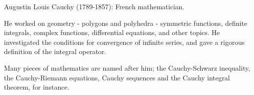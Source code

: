 Augustin Louis Cauchy (1789-1857): French mathematician.
\par
He worked on geometry - polygons and polyhedra - symmetric functions, 
definite integrals, complex functions, differential equations, and other
topics. He investigated the conditions for convergence
of infinite series, and gave a rigorous definition of the integral operator.
\par
Many pieces of mathematics are named after him; the Cauchy-Schwarz inequality,
the Cauchy-Riemann equations, Cauchy sequences and the Cauchy integral theorem, for
instance.